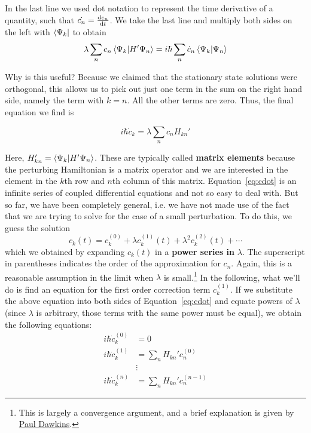 In the last line we used dot notation to represent the time derivative of a quantity, such that $\dot{c_n}=\dv{c_n}{t}$. We take the last line and multiply both sides on the left with $\bra{\Psi_k}$ to obtain
\begin{equation*}
	\lambda \sum_n c_n \braket{\Psi_k}{H'\Psi_n} = i\hbar \sum_n \dot{c}_n \braket{\Psi_k}{\Psi_n}
\end{equation*}

Why is this useful? Because we claimed that the stationary state solutions were orthogonal, this allows us to pick out just one term in the sum on the right hand side, namely the term with $k=n$. All the other terms are zero. Thus, the final equation we find is
\begin{tcolorbox}[title = Relationship for $c_k$] \vspace{-2ex}
	\begin{equation}
		i\hbar \dot{c}_k = \lambda \sum_n c_n H_{kn}' \label{eq:cdot}
	\end{equation}
\end{tcolorbox}

Here, $H_{kn}' = \braket{\Psi_k}{H'\Psi_n}$. These are typically called \textbf{matrix elements} because the perturbing Hamiltonian is a matrix operator and we are interested in the element in the $k$th row and $n$th column of this matrix. Equation~\ref{eq:cdot} is an infinite series of coupled differential equations and not so easy to deal with. But so far, we have been completely general, i.e. we have not made use of the fact that we are trying to solve for the case of a small perturbation. To do this, we guess the solution
\begin{equation}
	\boxed{c_k(t) = c_k^{(0)} + \lambda c_k^{(1)}(t) + \lambda^2 c_k^{(2)}(t) + \cdots} \label{eq:c-pow}
\end{equation}
which we obtained by expanding $c_k(t)$ in a \textbf{power series in} $\lambda$. The superscript in parentheses indicates the order of the approximation for $c_n$. Again, this is a reasonable assumption in the limit when $\lambda$ is small.\footnote{This is largely a convergence argument, and a brief explanation is given by \href{http://tutorial.math.lamar.edu/Classes/CalcII/PowerSeriesandFunctions.aspx}{Paul Dawkins}.} In the following, what we'll do is find an equation for the first order correction term $c_k^{(1)}$. If we substitute the above equation into both sides of Equation~\ref{eq:cdot} and equate powers of $\lambda$ (since $\lambda$ is arbitrary, those terms with the same power must be equal), we obtain the following equations:
\begin{align}
	i\hbar \dot{c}_k^{(0)} &= 0 \label{eq:cdot0} \\
	i\hbar \dot{c}_k^{(1)} &= \sum_n H_{kn}' c_n^{(0)} \label{eq:cdot1} \\
	&\vdots \nonumber \\
	i\hbar \dot{c}_k^{(n)} &= \sum_n H_{kn}' c_n^{(n-1)} \label{eq:cdotn}
\end{align}

